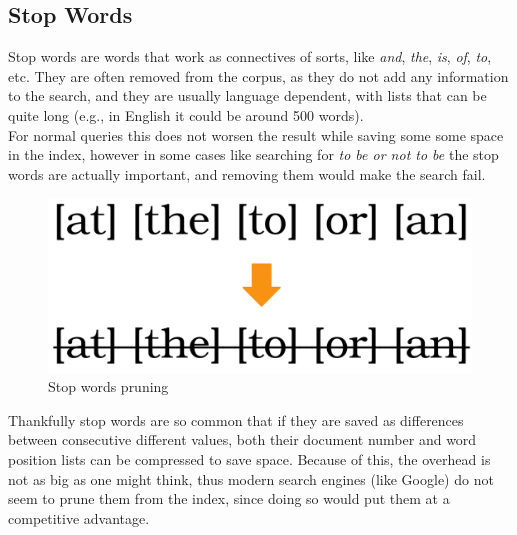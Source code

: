 \subsection{Stop Words}

Stop words are words that work as connectives of sorts, like \textit{and}, \textit{the}, \textit{is}, \textit{of}, \textit{to}, etc. They are often removed from the corpus, as they do not add any information to the search, and they are usually language dependent, with lists that can be quite long (e.g., in English it could be around 500 words). \\
For normal queries this does not worsen the result while saving some some space in the index, however in some cases like searching for \textit{to be or not to be} the stop words are actually important, and removing them would make the search fail. \\ 

\begin{figure} %
    \centering
    \includegraphics[width=.4\textwidth]{imgs/stopwords.png}
    \caption{Stop words pruning\label{fig:stopwords}}
\end{figure}

Thankfully stop words are so common that if they are saved as differences between consecutive different values, both their document number and word position lists can be compressed to save space. Because of this, the overhead is not as big as one might think, thus modern search engines (like Google) do not seem to prune them from the index, since doing so would put them at a competitive advantage. \\ 
